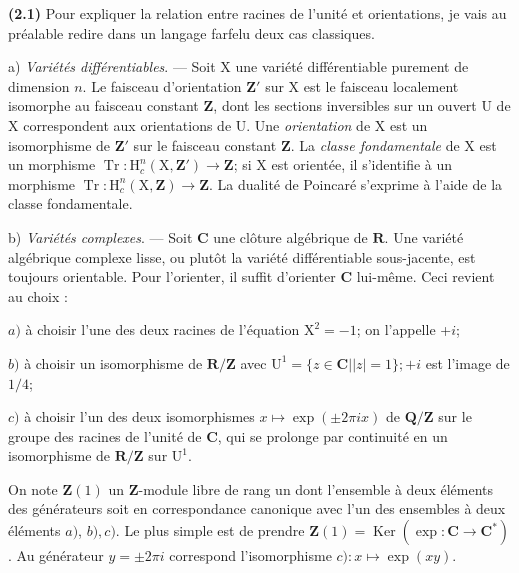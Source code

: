 \documentclass[10pt,leqno]{article}
\begin{document}
\noindent \textbf{(2.1)} Pour expliquer la relation entre racines de l’unité et orientations, je vais au préalable redire dans un langage farfelu deux cas classiques.\par

\noindent a) \emph{Variétés différentiables}. — Soit \(\mathrm{X}\) une variété différentiable purement de dimension \(n\). Le faisceau d’orientation \(\mathbf{Z}'\) sur \(\mathrm{X}\) est le faisceau localement isomorphe au faisceau constant \(\mathbf{Z}\), dont les sections inversibles sur un ouvert \(\mathrm{U}\) de \(\mathrm{X}\) correspondent aux orientations de \(\mathrm{U}\). Une \emph{orientation} de \(\mathrm{X}\) est un isomorphisme de \(\mathbf{Z}'\) sur le faisceau constant \(\mathbf{Z}\). La \emph{classe fondamentale} de \(\mathrm{X}\) est un morphisme \(\operatorname{Tr} : \mathrm{H}_{c}^{n}(\mathrm{X},\mathbf{Z}')\longrightarrow \mathbf{Z}\); si \(\mathrm{X}\) est orientée, il s’identifie à un morphisme \(\operatorname{Tr} : \mathrm{H}_{c}^{n}(\mathrm{X},\mathbf{Z})\longrightarrow \mathbf{Z}\). La dualité de Poincaré s’exprime à l’aide de la classe fondamentale.\par

\noindent b) \emph{Variétés complexes}. — Soit \(\mathbf{C}\) une clôture algébrique de \(\mathbf{R}\). Une variété algébrique complexe lisse, ou plutôt la variété différentiable sous-jacente, est toujours orientable. Pour l’orienter, il suffit d’orienter \(\mathbf{C}\) lui-même. Ceci revient au choix :\par

\noindent \(a)\) à choisir l’une des deux racines de l’équation \(\mathrm{X}^{2}=- 1\); on l’appelle +\(i\);\par

\noindent \(b)\) à choisir un isomorphisme de \(\mathbf{R}/\mathbf{Z}\) avec \(\mathrm{U}^{1}=\{z\in \mathbf{C} | |z|=1\}; +i\) est l’image de \(1/4\);\par

\noindent \(c)\) à choisir l’un des deux isomorphismes \(x\longmapsto \operatorname{exp}(\pm 2\pi ix)\) de \(\mathbf{Q}/\mathbf{Z}\) sur le groupe des racines de l’unité de \(\mathbf{C}\), qui se prolonge par continuité en un isomorphisme de \(\mathbf{R}/\mathbf{Z}\) sur \(\mathrm{U}^{1}\).\par

\noindent On note \(\mathbf{Z}(1)\) un \(\mathbf{Z}\)-module libre de rang un dont l’ensemble à deux éléments des générateurs soit en correspondance canonique avec l’un des ensembles à deux éléments \(a)\), \(b), c)\). Le plus simple est de prendre \(\mathbf{Z}(1)=\operatorname{Ker}(\operatorname{exp} : \mathbf{C}\longrightarrow \mathbf{C}^{*})\). Au générateur \(y=\pm 2\pi i\) correspond l’isomorphisme \(c) : x\longmapsto \operatorname{exp}(xy)\).\par
\end{document}
